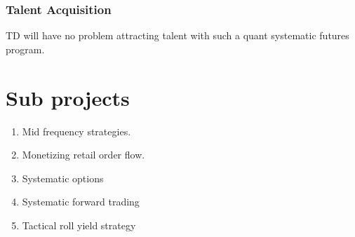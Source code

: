 \documentclass{article}
\begin{document}
\subsubsection{Talent Acquisition}
TD will have no problem attracting talent with such a quant systematic futures program.




\section{Sub projects}
\begin{enumerate}
\item Mid frequency strategies.
\item Monetizing retail order flow.
\item Systematic options
\item Systematic forward trading
\item Tactical roll yield strategy
\end{enumerate}


\end{document}
